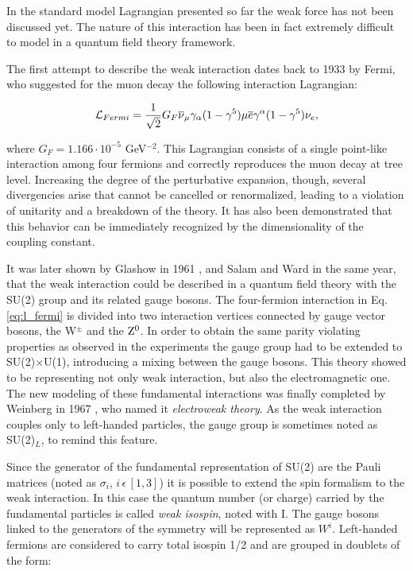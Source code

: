 In the standard model Lagrangian presented so far the weak force has not been discussed yet. The nature of this interaction has been in fact extremely difficult to model in a quantum field theory framework.

The first attempt to describe the weak interaction dates back to 1933 by Fermi, who suggested for the muon decay the following interaction Lagrangian:

\begin{equation}
\mathcal{L}_{Fermi} = \dfrac{1}{\sqrt{2}} G_F \overline{\nu}_\mu \gamma_\alpha (1-\gamma^5) \mu \overline{e} \gamma^\alpha (1-\gamma^5) \nu_e,
\label{eq:l_fermi}
\end{equation}

where $G_F = 1.166 \cdot 10^{-5}$ GeV$^{-2}$. This Lagrangian consists of a single point-like interaction among four fermions and correctly reproduces the muon decay at tree level. Increasing the degree of the perturbative expansion, though, several divergencies arise that cannot be cancelled or renormalized, leading to a violation of unitarity and a breakdown of the theory. It has also been demonstrated that this behavior can be immediately recognized by the dimensionality of the coupling constant.

It was later shown by Glashow in 1961 \cite{Glashow:1961tr}, and Salam and Ward \cite{Salam:1961en} in the same year, that the weak interaction could be described in a quantum field theory with the SU(2) group and its related gauge bosons. 
The four-fermion interaction in Eq. \ref{eq:l_fermi} is divided into two interaction vertices connected by gauge vector bosons, the W$^\pm$ and the $\mathrm{Z}^0$. In order to obtain the same parity violating properties as observed in the experiments the gauge group had to be extended to SU(2)$\times$U(1), introducing a mixing between the gauge bosons. This theory showed to be representing not only weak interaction, but also the electromagnetic one. 
The new modeling of these fundamental interactions was finally completed by Weinberg in 1967 \cite{Weinberg:1967tq}, who named it \emph{electroweak theory}. 
As the weak interaction couples only to left-handed particles, the gauge group is sometimes noted as SU(2)$_L$, to remind this feature.

Since the generator of the fundamental representation of SU(2) are the Pauli matrices (noted as $\sigma_i$, $i \, \epsilon \, [1,3]$) it is possible to extend the spin formalism to the weak interaction. In this case the quantum number (or charge) carried by the fundamental particles is called \emph{weak isospin}, noted with I. The gauge bosons linked to the generators of the symmetry will be represented as $W^i$. Left-handed fermions are considered to carry total isospin 1/2 and are grouped in doublets of the form:

